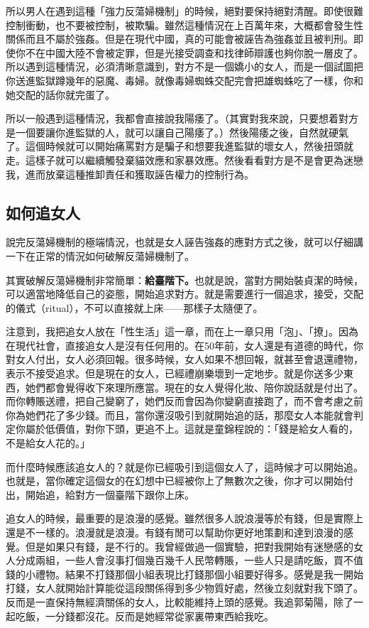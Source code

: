 所以男人在遇到這種「強力反蕩婦機制」的時候，絕對要保持絕對清醒。即使很難控制衝動，也不要被控制，被欺騙。雖然這種情況在上百萬年來，大概都會發生性關係而且不屬於強姦。但是在現代中國，真的可能會被誣告為強姦並且被判刑。即使你不在中國大陸不會被定罪，但是光接受調查和找律師辯護也夠你脫一層皮了。所以遇到這種情況，必須清晰意識到，對方不是一個嬌小的女人，而是一個試圖把你送進監獄蹲幾年的惡魔、毒婦。就像毒婦蜘蛛交配完會把雄蜘蛛吃了一樣，你和她交配的話你就完蛋了。

所以一般遇到這種情況，我都會直接說我陽痿了。（其實對我來說，只要想着對方是一個要讓你進監獄的人，就可以讓自己陽痿了。）然後陽痿之後，自然就硬氣了。這個時候就可以開始痛罵對方是騙子和想要我進監獄的壞女人，然後扭頭就走。這樣子就可以繼續觸發棄貓效應和家暴效應。然後看看對方是不是會更為迷戀我，進而放棄這種推卸責任和獲取誣告權力的控制行為。

\subsection{如何追女人}

說完反蕩婦機制的極端情況，也就是女人誣告強姦的應對方式之後，就可以仔細講一下在正常的情況如何破解反蕩婦機制了。

其實破解反蕩婦機制非常簡單：\textbf{給臺階下。}也就是說，當對方開始裝貞潔的時候，可以適當地降低自己的姿態，開始追求對方。就是需要進行一個追求，接受，交配的儀式（ritual），不可以直接就上床——那樣子太隨便了。

注意到，我把追女人放在「性生活」這一章，而在上一章只用「泡」、「撩」。因為在現代社會，直接追女人是沒有任何用的。在50年前，女人還是有道德的時代，你對女人付出，女人必須回報。很多時候，女人如果不想回報，就甚至會退還禮物，表示不接受追求。但是現在的女人，已經禮崩樂壞到一定地步。就是你送多少東西，她們都會覺得收下來理所應當。現在的女人覺得化妝、陪你說話就是付出了。而你轉賬送禮，把自己變窮了，她們反而會因為你變窮直接跑了，而不會考慮之前你為她們花了多少錢。而且，當你還沒吸引到就開始追的話，那麼女人本能就會判定你屬於低價值，對你下頭，更追不上。這就是童錦程說的：「錢是給女人看的，不是給女人花的。」

而什麼時候應該追女人的？就是你已經吸引到這個女人了，這時候才可以開始追。也就是，當你確定這個女的在幻想中已經被你上了無數次之後，你才可以開始付出，開始追，給對方一個臺階下跟你上床。

追女人的時候，最重要的是浪漫的感覺。雖然很多人說浪漫等於有錢，但是實際上還是不一樣的。浪漫就是浪漫。有錢有閒可以幫助你更好地策劃和達到浪漫的感覺。但是如果只有錢，是不行的。我曾經做過一個實驗，把對我開始有迷戀感的女人分成兩組，一些人會沒事打個幾百幾千人民幣轉賬，一些人只是請吃飯，買不值錢的小禮物。結果不打錢那個小組表現比打錢那個小組要好得多。感覺是我一開始打錢，女人就開始計算能從這段關係得到多少物質好處，然後立刻就對我下頭了。反而是一直保持無經濟關係的女人，比較能維持上頭的感覺。我追郭菊陽，除了一起吃飯，一分錢都沒花。反而是她經常從家裏帶東西給我吃。

